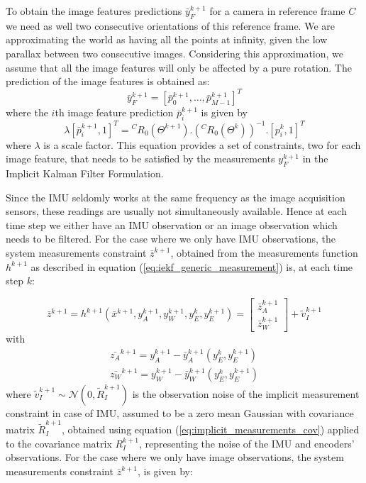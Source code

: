 To obtain the image features predictions $\bar{y}_{F}^{k+1}$ for a camera in reference frame $C$ we need as well two consecutive orientations of this reference frame. We are approximating the world as having all the points at infinity, given the low parallax between two consecutive images. Considering this approximation, we assume that all the image features will only be affected by a pure rotation. The prediction of the image features is obtained as:
\begin{equation}
\bar{y}_{F}^{k+1}=\left[\bar{p}_{0}^{k+1},\ldots,\bar{p}_{M-1}^{k+1}\right]^{T}
\end{equation}
where the $i$th image feature prediction $\bar{p}_{i}^{k+1}$ is given by
\begin{dmath}
\lambda\left[\bar{p}_{i}^{k+1},1\right]^{T}={}^{C}R_{0}\left(\Theta^{k+1}\right).\left(^{C}R_{0}\left(\Theta^{k}\right)\right)^{-1}.\left[p_{i}^{k},1\right]^{T}
\label{eq: zf_pred}
\end{dmath}
where $\lambda$ is a scale factor. This equation provides a set of constraints, two for each image feature, that needs to be satisfied by the measurements $y_F^{k+1}$ in the Implicit Kalman Filter Formulation.

Since the IMU seldomly works at the same frequency as the image acquisition sensors, these readings are usually not simultaneously available. Hence at each time step we either have an IMU observation or an image observation which needs to be filtered. For the case where we only have IMU observations, the system measurements constraint $\bar{z}^{k+1}$, obtained from the measurements function $h^{k+1}$ as described in equation (\ref{eq:iekf_generic_measurement}) is, at each time step $k$:

\begin{dmath}
\bar{z}^{k+1}=h^{k+1}\left(\bar{x}^{k+1},y_{A}^{k+1},y_{W}^{k+1},y_{E}^{k},y_{E}^{k+1}\right)=\left[\begin{array}{c}
\bar{z}_{A}^{k+1}\\
\bar{z}_{W}^{k+1}
\end{array}\right]+\tilde{v}_{I}^{k+1}
\end{dmath}
with
\begin{dmath}
\begin{array}{c}
\bar{z_{A}}^{k+1}=y_{A}^{k+1}-\bar{y}_{A}^{k+1}\left(y_{E}^{k},y_{E}^{k+1}\right)\\
\bar{z_{W}}^{k+1}=y_{W}^{k+1}-\bar{y}_{W}^{k+1}\left(y_{E}^{k},y_{E}^{k+1}\right)
\end{array}
\label{eq:z_imu}
\end{dmath}
where $\tilde{v}_I^{k+1}\sim \mathcal{N}\left(0,\tilde{R}_I^{k+1}\right)$ is the observation noise of the implicit measurement constraint in case of IMU, assumed to be a zero mean Gaussian with covariance matrix $\tilde{R}_I^{k+1}$, obtained using equation (\ref{eq:implicit_measurements_cov}) applied to the covariance matrix $R_I^{k+1}$, representing the noise of the IMU and encoders' observations. For the case where we only have image observations, the system measurements constraint $\bar{z}^{k+1}$, is given by:

